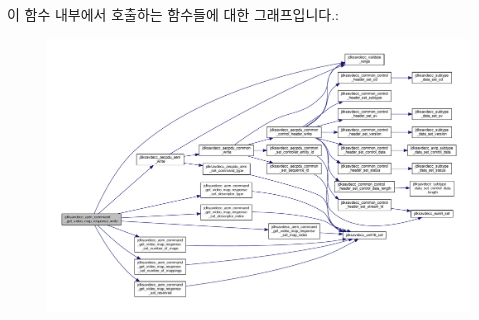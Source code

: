 이 함수 내부에서 호출하는 함수들에 대한 그래프입니다.\+:
\nopagebreak
\begin{figure}[H]
\begin{center}
\leavevmode
\includegraphics[width=350pt]{group__command__get__video__map__response_ga184c3bd7c9052f068f903138b5d9d030_cgraph}
\end{center}
\end{figure}


